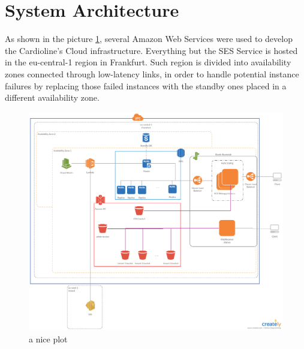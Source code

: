 \section{System Architecture}
As shown in the picture \ref{fig:architecture}, several Amazon Web Services were used to develop the Cardioline's Cloud infrastructure.
Everything but the SES Service is hosted in the eu-central-1 region in Frankfurt. Such region is divided into availability zones connected through low-latency links, in order to handle potential instance failures by replacing those failed instances with the standby ones placed in a different availability zone.\\

\begin{figure}[h]
    \includegraphics[width=\textwidth]{architecture}
    \caption{a nice plot}
    \label{fig:architecture}
\end{figure}